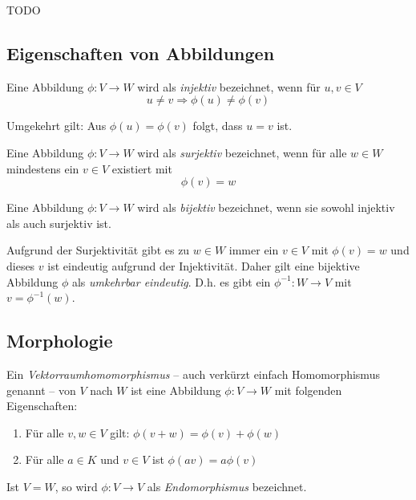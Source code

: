 TODO

\subsection{Eigenschaften von Abbildungen}


\begin{definition}
Eine Abbildung $\phi : V \longrightarrow W$ wird als \textsl{injektiv} bezeichnet, wenn für $u,v \in V$ 
\[ u\ne v \Rightarrow \phi(u) \ne \phi(v) \]
\end{definition}
Umgekehrt gilt: Aus $\phi(u)=\phi(v)$ folgt, dass $u=v$ ist. 

\begin{definition}
Eine Abbildung $\phi : V \longrightarrow W$ wird als \textsl{surjektiv} bezeichnet, wenn für alle $w\in W$ mindestens ein $v\in V$ existiert mit 
\[\phi(v) = w\]
\end{definition}

\begin{definition}
Eine Abbildung $\phi : V \longrightarrow W$ wird als \textsl{bijektiv} bezeichnet, wenn sie sowohl injektiv als auch surjektiv ist. 
\end{definition}

Aufgrund der Surjektivität gibt es zu $w\in W$ immer ein $v\in V$  mit $\phi(v)=w$ und dieses $v$ ist eindeutig aufgrund der Injektivität. Daher gilt eine bijektive Abbildung $\phi$ als \textsl{umkehrbar eindeutig}. D.h. es gibt ein $\phi^{-1} : W \longrightarrow V$ mit $v = \phi^{-1}(w)$.

\subsection{Morphologie}

\begin{definition}

Ein \textsl{Vektorraumhomomorphismus} -- auch verkürzt einfach Homomorphismus genannt -- von $V$ nach $W$ ist eine Abbildung $\phi : V \longrightarrow W$ mit folgenden Eigenschaften:
\begin{enumerate}
\item Für alle $v,w \in V$ gilt: $\phi(v+w) = \phi(v)+\phi(w)$
\item Für alle $a\in K$ und $v\in V$ ist $\phi(av)=a\phi(v)$
\end{enumerate}
Ist $V=W$, so wird $\phi : V\longrightarrow V$ als \textsl{Endomorphismus} bezeichnet.
\end{definition}

